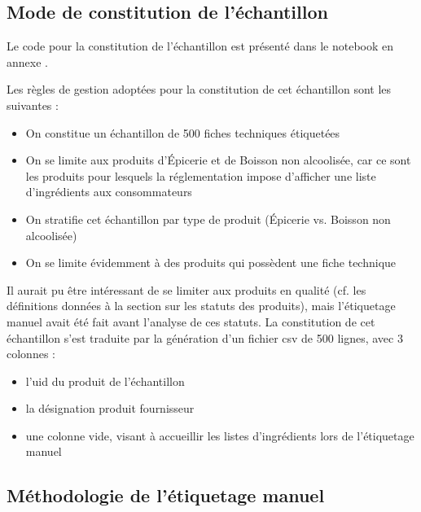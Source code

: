             \subsection{Mode de constitution de l'échantillon}
            
            Le code pour la constitution de l'échantillon est présenté dans le notebook en annexe .

            Les règles de gestion adoptées pour la constitution de cet échantillon sont les suivantes :
            \begin{itemize}
                \item On constitue un échantillon de 500 fiches techniques étiquetées
                \item On se limite aux produits d'\'{E}picerie et de Boisson non alcoolisée, car ce sont les produits pour lesquels la réglementation impose d'afficher une liste d'ingrédients aux consommateurs
                \item On stratifie cet échantillon par type de produit (\'{E}picerie vs. Boisson non alcoolisée)
                \item On se limite évidemment à des produits qui possèdent une fiche technique
            \end{itemize}
            Il aurait pu être intéressant de se limiter aux produits \og en qualité \fg (cf. les définitions données à la section  sur les statuts des produits), mais l'étiquetage manuel avait été fait avant l'analyse de ces statuts.
            La constitution de cet échantillon s'est traduite par la génération d'un fichier csv de 500 lignes, avec 3 colonnes : 
            \begin{itemize}
                \item l'uid du produit de l'échantillon
                \item la désignation produit fournisseur
                \item une colonne vide, visant à accueillir les listes d'ingrédients lors de l'étiquetage manuel
            \end{itemize}

            \subsection{Méthodologie de l'étiquetage manuel}

